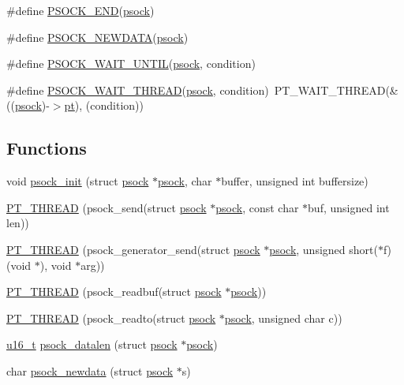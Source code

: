 \begin{DoxyCompactItemize}
\item 
\#define \hyperlink{group__psock_ga4a264bb64ae706d53f572b1d9e4037a2}{PSOCK\_\-END}(\hyperlink{structpsock}{psock})
\item 
\#define \hyperlink{group__psock_ga55ce98ea4d6f22e9d5068b904d4d2447}{PSOCK\_\-NEWDATA}(\hyperlink{structpsock}{psock})
\item 
\#define \hyperlink{group__psock_ga2ebfe5c8a7f3173714efdf2df74fc392}{PSOCK\_\-WAIT\_\-UNTIL}(\hyperlink{structpsock}{psock}, condition)
\item 
\#define \hyperlink{group__psock_gaa87ff36af81990e6ffe20d76d5e4606f}{PSOCK\_\-WAIT\_\-THREAD}(\hyperlink{structpsock}{psock}, condition)~PT\_\-WAIT\_\-THREAD(\&((\hyperlink{structpsock}{psock})-\/$>$\hyperlink{structpt}{pt}), (condition))
\end{DoxyCompactItemize}
\subsection*{Functions}
\begin{DoxyCompactItemize}
\item 
void \hyperlink{group__psock_ga86cc77c910c9a27b614fedf3ff8294bf}{psock\_\-init} (struct \hyperlink{structpsock}{psock} $\ast$\hyperlink{structpsock}{psock}, char $\ast$buffer, unsigned int buffersize)
\item 
\hyperlink{group__psock_ga712420c615c932642b69c6c0bb8d13ac}{PT\_\-THREAD} (psock\_\-send(struct \hyperlink{structpsock}{psock} $\ast$\hyperlink{structpsock}{psock}, const char $\ast$buf, unsigned int len))
\item 
\hyperlink{group__psock_ga7440860cfbffad961f993737932d17d7}{PT\_\-THREAD} (psock\_\-generator\_\-send(struct \hyperlink{structpsock}{psock} $\ast$\hyperlink{structpsock}{psock}, unsigned short($\ast$f)(void $\ast$), void $\ast$arg))
\item 
\hyperlink{group__psock_gadb49ec06eee4fb369d8d3a414143bb14}{PT\_\-THREAD} (psock\_\-readbuf(struct \hyperlink{structpsock}{psock} $\ast$\hyperlink{structpsock}{psock}))
\item 
\hyperlink{group__psock_ga3b0505ebccc87d4c1ab7b0e875d53839}{PT\_\-THREAD} (psock\_\-readto(struct \hyperlink{structpsock}{psock} $\ast$\hyperlink{structpsock}{psock}, unsigned char c))
\item 
\hyperlink{group__uipfw_ga77570ac4fcab86864fa1916e55676da2}{u16\_\-t} \hyperlink{group__psock_ga3178402dd725776415bf9745e7bf92ba}{psock\_\-datalen} (struct \hyperlink{structpsock}{psock} $\ast$\hyperlink{structpsock}{psock})
\item 
char \hyperlink{group__psock_ga3b19f65e48079d8105be2a99b5b4b2ae}{psock\_\-newdata} (struct \hyperlink{structpsock}{psock} $\ast$s)
\end{DoxyCompactItemize}



